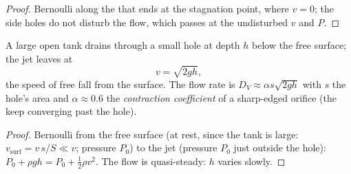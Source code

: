 \begin{proof}
Bernoulli along the  that ends at the stagnation point, where
$v = 0$; the side holes do not disturb the flow, which passes at the
undisturbed $v$ and $P$.
\end{proof}

\begin{proposition}\label{prop:b2:euler-bernoulli:torricelli}
A large open tank drains through a small hole at depth $h$ below the
free surface; the jet leaves at
\[
v = \sqrt{2gh} ,
\]
the speed of free fall from the surface. The flow rate is $D_V \approx
\alpha s\sqrt{2gh}$ with $s$ the hole's area and $\alpha \approx 0.6$ the
\emph{contraction coefficient} of a sharp-edged orifice (the 
keep converging past the hole).
\end{proposition}

\begin{proof}
Bernoulli from the free surface (at rest, since the tank is large:
$v_{\text{surf}} = v\,s/S \ll v$; pressure $P_0$) to the jet (pressure $P_0$
just outside the hole): $P_0 + \rho gh = P_0 + \tfrac12\rho v^2$. The flow
is quasi-steady: $h$ varies slowly.
\end{proof}

